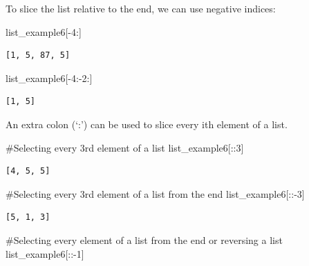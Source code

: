 \documentclass[
  letterpaper,
  DIV=11,
  numbers=noendperiod]{scrreprt}
\newenvironment{Shaded}{\begin{snugshade}}{\end{snugshade}}
\newcommand{\CommentTok}[1]{\textcolor[rgb]{0.37,0.37,0.37}{#1}}
\newcommand{\DecValTok}[1]{\textcolor[rgb]{0.68,0.00,0.00}{#1}}
\newcommand{\NormalTok}[1]{\textcolor[rgb]{0.00,0.23,0.31}{#1}}
\newcommand{\OperatorTok}[1]{\textcolor[rgb]{0.37,0.37,0.37}{#1}}
\begin{document}
To slice the list relative to the end, we can use negative indices:

\begin{Shaded}
\begin{Highlighting}[]
\NormalTok{list\_example6[}\OperatorTok{{-}}\DecValTok{4}\NormalTok{:]}
\end{Highlighting}
\end{Shaded}

\begin{verbatim}
[1, 5, 87, 5]
\end{verbatim}

\begin{Shaded}
\begin{Highlighting}[]
\NormalTok{list\_example6[}\OperatorTok{{-}}\DecValTok{4}\NormalTok{:}\OperatorTok{{-}}\DecValTok{2}\NormalTok{:]}
\end{Highlighting}
\end{Shaded}

\begin{verbatim}
[1, 5]
\end{verbatim}

An extra colon (`:') can be used to slice every ith element of a list.

\begin{Shaded}
\begin{Highlighting}[]
\CommentTok{\#Selecting every 3rd element of a list}
\NormalTok{list\_example6[::}\DecValTok{3}\NormalTok{]}
\end{Highlighting}
\end{Shaded}

\begin{verbatim}
[4, 5, 5]
\end{verbatim}

\begin{Shaded}
\begin{Highlighting}[]
\CommentTok{\#Selecting every 3rd element of a list from the end}
\NormalTok{list\_example6[::}\OperatorTok{{-}}\DecValTok{3}\NormalTok{]}
\end{Highlighting}
\end{Shaded}

\begin{verbatim}
[5, 1, 3]
\end{verbatim}

\begin{Shaded}
\begin{Highlighting}[]
\CommentTok{\#Selecting every element of a list from the end or reversing a list }
\NormalTok{list\_example6[::}\OperatorTok{{-}}\DecValTok{1}\NormalTok{]}
\end{Highlighting}
\end{Shaded}
\end{document}
